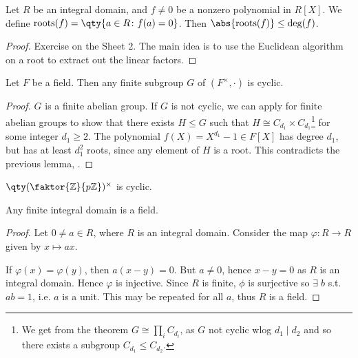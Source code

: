 \begin{lemma} \label{lem:9.2}
	Let $R$ be an integral domain, and $f \neq 0$ be a nonzero polynomial in $R[X]$.
	We define $\mathrm{roots}(f) = \qty{a \in R \colon f(a) = 0}$.
	Then $\abs{\mathrm{roots}(f)} \leq \mathrm{deg}(f)$.
\end{lemma}

\begin{proof}
	Exercise on the Sheet 2.
	The main idea is to use the Euclidean algorithm on a root to extract out the linear factors.
\end{proof}

\begin{theorem} \label{thm:9.3}
	Let $F$ be a field.
	Then any finite subgroup $G$ of $(F^\times, \cdot)$ is cyclic.
\end{theorem}

\begin{proof}
	$G$ is a finite abelian group.
	If $G$ is not cyclic, we can apply  for finite abelian groups to show that there exists $H \leq G$ such that $H \cong C_{d_1} \times C_{d_1}$\footnote{We get from the theorem $G \cong \prod_i C_{d_i}$, as $G$ not cyclic wlog $d_1 \mid d_2$ and so there exists a subgroup $C_{d_1} \leq C_{d_2}$.} for some integer $d_1 \geq 2$.
	The polynomial $f(X) = X^{d_1} - 1 \in F[X]$ has degree $d_1$, but has at least $d_1^2$ roots, since any element of $H$ is a root.
	This contradicts the previous lemma, .
\end{proof}

\begin{example}
	$\qty(\faktor{\mathbb Z}{p\mathbb Z})^\times$ is cyclic.
\end{example}

\begin{proposition} \label{prp:9.4}
	Any finite integral domain is a field.
\end{proposition}

\begin{proof}
	Let $0 \neq a \in R$, where $R$ is an integral domain.
	Consider the map $\varphi \colon R \to R$ given by $x \mapsto ax$.

	If $\varphi(x) = \varphi(y)$, then $a(x-y) = 0$.
	But $a \neq 0$, hence $x - y = 0$ as $R$ is an integral domain.
	Hence $\varphi$ is injective.
	Since $R$ is finite, $\phi$ is surjective so $\exists \; b$ s.t. $ab = 1$, i.e. $a$ is a unit.
	This may be repeated for all $a$, thus $R$ is a field.
\end{proof}

